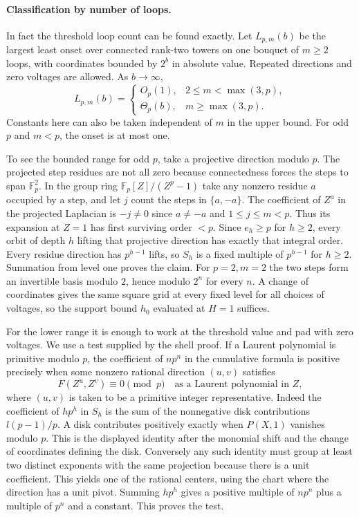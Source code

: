 \paragraph{Classification by number of loops.}
In fact the threshold loop count can be found exactly. Let $L_{p,m}(b)$
be the largest least onset over connected rank-two towers on one bouquet
of $m\ge2$ loops, with coordinates bounded by $2^b$ in absolute value.
Repeated directions and zero voltages are allowed. As $b\to\infty$,
\[
 \boxed{\quad L_{p,m}(b)=
 \begin{cases}
 O_p(1),&2\le m<\max(3,p),\\
 \Theta_p(b),&m\ge\max(3,p).
 \end{cases}\quad}
\]
Constants here can also be taken independent of $m$ in the upper
bound. For odd $p$ and $m<p$, the onset is at most one.

To see the bounded range for odd $p$, take a projective direction
modulo $p$. The projected step residues are not all zero because
connectedness forces the steps to span $\mathbb F_p^2$. In the group
ring $\mathbb F_p[Z]/(Z^p-1)$ take any nonzero residue $a$ occupied
by a step, and let $j$ count the steps in $\{a,-a\}$. The
coefficient of $Z^a$ in the projected Laplacian is $-j\ne0$
since $a\ne-a$ and $1\le j\le m<p$. Thus its expansion at $Z=1$
has first surviving order $<p$. Since $e_h\ge p$ for $h\ge2$,
every orbit of depth $h$ lifting that projective direction has exactly
that integral order. Every residue direction has $p^{h-1}$ lifts,
so $S_h$ is a fixed multiple of $p^{h-1}$ for $h\ge2$. Summation
from level one proves the claim.
For $p=2,m=2$ the two steps form an invertible basis modulo $2$,
hence modulo $2^n$ for every $n$. A change of coordinates gives the
same square grid at every fixed level for all choices of voltages,
so the support bound $h_0$ evaluated at $H=1$ suffices.

For the lower range it is enough to work at the threshold value
and pad with zero voltages. We use a test supplied by the shell proof.
If a Laurent polynomial is primitive modulo $p$, the coefficient of
$np^n$ in the cumulative formula is positive precisely when some
nonzero rational direction $(u,v)$ satisfies
\[
                F(Z^u,Z^v)\equiv0\pmod p
                \quad\text{as a Laurent polynomial in }Z,
\]
where $(u,v)$ is taken to be a primitive integer representative.
Indeed the coefficient of $h p^h$ in $S_h$ is the sum of the
nonnegative disk contributions $l(p-1)/p$. A disk contributes
positively exactly when $P(X,1)$ vanishes modulo $p$. This is the
displayed identity after the monomial shift and the change of
coordinates defining the disk. Conversely any such identity must
group at least two distinct exponents with the same projection
because there is a unit coefficient. This yields one of the
rational centers, using the chart where the direction has a unit
pivot. Summing $hp^h$ gives a positive multiple of $np^n$
plus a multiple of $p^n$ and a constant. This proves the test.

